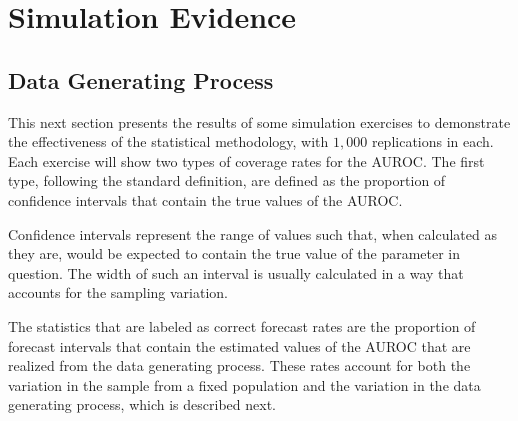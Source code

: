 

\section{Simulation Evidence} \label{sec:sims}



\subsection{Data Generating Process}


This next section presents the results of some simulation exercises to demonstrate the effectiveness of the statistical methodology, with $1,000$ replications in each.
%
Each exercise will show two types of coverage rates for the AUROC.
%
The first type, following the standard definition, are defined as the proportion of confidence intervals that contain the true values of the AUROC.

Confidence intervals represent the range of values such that, when calculated as they are, would be expected to contain the true value of the parameter in question.
The width of such an interval is usually calculated in a way that accounts for the sampling variation.

The statistics that are labeled as correct forecast rates are the proportion of forecast intervals that contain the estimated values of the AUROC that are realized from the data generating process.
These rates account for both the variation in the sample from a fixed population and the variation in the data generating process, which is described next.



